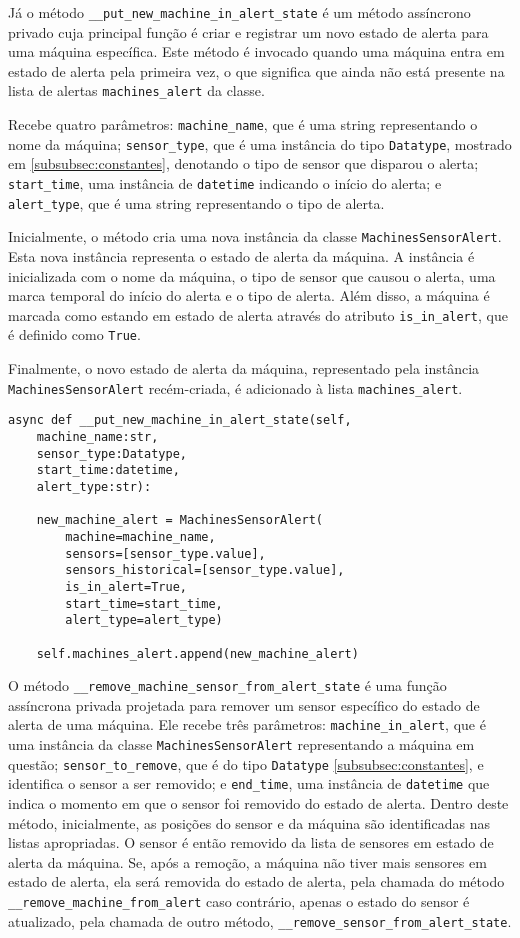 Já o método \texttt{\_\_put\_new\_machine\_in\_alert\_state} é um método assíncrono privado cuja principal função é criar e registrar um novo estado de alerta para uma máquina específica. Este método é invocado quando uma máquina entra em estado de alerta pela primeira vez, o que significa que ainda não está presente na lista de alertas \texttt{machines\_alert} da classe.

Recebe quatro parâmetros: \texttt{machine\_name}, que é uma string representando o nome da máquina; \texttt{sensor\_type}, que é uma instância do tipo \texttt{Datatype}, mostrado em \ref{subsubsec:constantes}, denotando o tipo de sensor que disparou o alerta; \texttt{start\_time}, uma instância de \texttt{datetime} indicando o início do alerta; e \texttt{alert\_type}, que é uma string representando o tipo de alerta.

Inicialmente, o método cria uma nova instância da classe \texttt{MachinesSensorAlert}. Esta nova instância representa o estado de alerta da máquina. A instância é inicializada com o nome da máquina, o tipo de sensor que causou o alerta, uma marca temporal do início do alerta e o tipo de alerta. Além disso, a máquina é marcada como estando em estado de alerta através do atributo \texttt{is\_in\_alert}, que é definido como \texttt{True}.

Finalmente, o novo estado de alerta da máquina, representado pela instância \texttt{MachinesSensorAlert} recém-criada, é adicionado à lista \texttt{machines\_alert}.

\begin{verbatim}
async def __put_new_machine_in_alert_state(self,
    machine_name:str,
    sensor_type:Datatype,
    start_time:datetime,
    alert_type:str):

    new_machine_alert = MachinesSensorAlert(
        machine=machine_name,
        sensors=[sensor_type.value],
        sensors_historical=[sensor_type.value],
        is_in_alert=True,
        start_time=start_time,
        alert_type=alert_type)

    self.machines_alert.append(new_machine_alert)
\end{verbatim}

O método \texttt{\_\_remove\_machine\_sensor\_from\_alert\_state} é uma função assíncrona privada projetada para remover um sensor específico do estado de alerta de uma máquina. Ele recebe três parâmetros: \texttt{machine\_in\_alert}, que é uma instância da classe \texttt{MachinesSensorAlert} representando a máquina em questão; \texttt{sensor\_to\_remove}, que é do tipo \texttt{Datatype} \ref{subsubsec:constantes}, e identifica o sensor a ser removido; e \texttt{end\_time}, uma instância de \texttt{datetime} que indica o momento em que o sensor foi removido do estado de alerta. Dentro deste método, inicialmente, as posições do sensor e da máquina são identificadas nas listas apropriadas. O sensor é então removido da lista de sensores em estado de alerta da máquina. Se, após a remoção, a máquina não tiver mais sensores em estado de alerta, ela será removida do estado de alerta, pela chamada do método \texttt{\_\_remove\_machine\_from\_alert} caso contrário, apenas o estado do sensor é atualizado, pela chamada de outro método, \texttt{\_\_remove\_sensor\_from\_alert\_state}.

